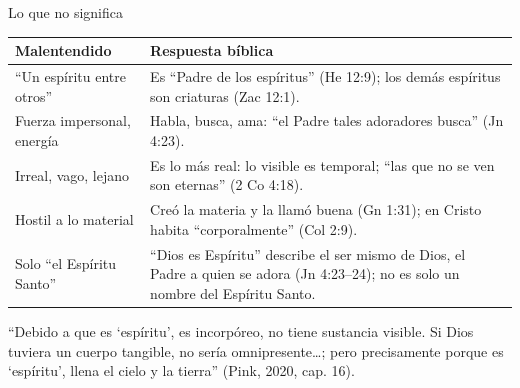 \begin{frame}{Lo que no significa}
\scriptsize\renewcommand{\arraystretch}{1.2}
\begin{tabular}{@{}>{\RaggedRight\arraybackslash}p{3.5cm}>{\RaggedRight\arraybackslash}p{8.3cm}@{}}
\toprule
\textbf{Malentendido} & \textbf{Respuesta bíblica} \\ \midrule
``Un espíritu entre otros'' & Es ``Padre de los espíritus'' (He 12:9); los demás espíritus son criaturas (Zac 12:1). \\
Fuerza impersonal, energía & Habla, busca, ama: ``el Padre tales adoradores busca'' (Jn 4:23). \\
Irreal, vago, lejano & Es lo más real: lo visible es temporal; ``las que no se ven son eternas'' (2 Co 4:18). \\
Hostil a lo material & Creó la materia y la llamó buena (Gn 1:31); en Cristo habita ``corporalmente'' (Col 2:9). \\
Solo ``el Espíritu Santo'' & ``Dios es Espíritu'' describe el ser mismo de Dios, el Padre a quien se adora (Jn 4:23--24); no es solo un nombre del Espíritu Santo. \\
\bottomrule
\end{tabular}\par\medskip
\begin{tcolorbox}[colback=papiro,colframe=dorado,boxrule=1.2pt,arc=3pt]
\small ``Debido a que es `espíritu', es incorpóreo, no tiene sustancia visible. Si Dios tuviera un cuerpo tangible, no sería omnipresente\ldots; pero precisamente porque es `espíritu', llena el cielo y la tierra'' (Pink, 2020, cap. 16).
\end{tcolorbox}
\end{frame}

